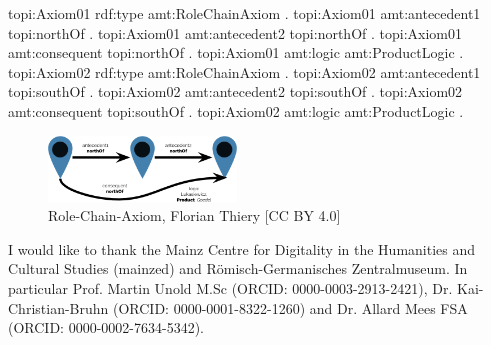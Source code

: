 \documentclass[twocolumn]{autart}
\begin{document}
\begin{verbnobox}
topi:Axiom01 rdf:type amt:RoleChainAxiom .
topi:Axiom01 amt:antecedent1 topi:northOf .
topi:Axiom01 amt:antecedent2 topi:northOf .
topi:Axiom01 amt:consequent topi:northOf .
topi:Axiom01 amt:logic amt:ProductLogic .
topi:Axiom02 rdf:type amt:RoleChainAxiom .
topi:Axiom02 amt:antecedent1 topi:southOf .
topi:Axiom02 amt:antecedent2 topi:southOf .
topi:Axiom02 amt:consequent topi:southOf .
topi:Axiom02 amt:logic amt:ProductLogic .
\end{verbnobox}

\begin{figure}[!htb]
\begin{center}
\includegraphics[width=5cm]{axiom_rolechain.png}
\caption{Role-Chain-Axiom, Florian Thiery [CC BY 4.0]}
\label{rca}
\end{center}
\end{figure}

\begin{ack}                               
I would like to thank the Mainz Centre for Digitality in the Humanities and Cultural Studies (mainzed) and R\"omisch-Germanisches Zentralmuseum. In particular Prof. Martin Unold M.Sc (ORCID: 0000-0003-2913-2421), Dr. Kai-Christian-Bruhn (ORCID: 0000-0001-8322-1260) and Dr. Allard Mees FSA (ORCID: 0000-0002-7634-5342).
\end{ack}



\end{document}
